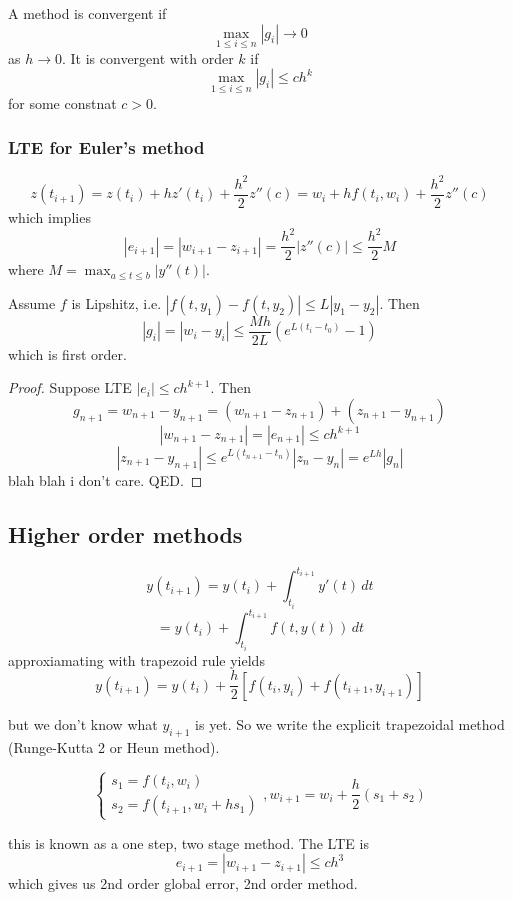 \documentclass[11pt]{article}
\begin{document}
\begin{definition}
    A method is convergent if 
    \[
        \max_{1 \le i \le n} |g_i| \rightarrow 0
    \]
    as $h \rightarrow 0$. It is convergent with order $k$ if 
       \[
        \max_{1 \le i \le n} |g_i| \le ch^k
    \] 
    for some constnat $c>0$.
\end{definition}

\subsubsection{LTE for Euler's method}
\[
    z(t_{i+1}) = z(t_i) + h z'(t_i) + \frac{h^2}{2}z''(c) = w_i + hf(t_i, w_i)+\frac{h^2}{2}z''(c)
\]
which implies
\[
    |e_{i+1}| = |w_{i+1}-z_{i+1}| = \frac{h^2}{2}|z''(c)| \le \frac{h^2}{2}M
\]
where $M = \max_{a \le t \le b} |y''(t)|$.

\begin{theorem}
    Assume $f$ is Lipshitz, i.e. $|f(t,y_1) - f(t,y_2)| \le L|y_1-y_2|$.
    Then
    \[
        |g_i| = |w_i-y_i| \le \frac{Mh}{2L}(e^{L(t_i-t_0)}-1)
    \]
    which is first order.
\end{theorem}

\begin{proof}
    Suppose LTE $|e_i| \le ch^{k+1}$. Then
    \[
        g_{n+1} = w_{n+1}-y_{n+1}= (w_{n+1}-z_{n+1})+(z_{n+1}-y_{n+1})
    \]
    \[
        |w_{n+1}-z_{n+1}| = |e_{n+1}| \le ch^{k+1}
    \]
    \[
        |z_{n+1}-y_{n+1}| \le e^{L(t_{n+1}-t_n)}|z_n-y_n| = e^{Lh}|g_n|
    \]
    blah blah i don't care. QED.
\end{proof}

\subsection{Higher order methods}

\[
    y(t_{i+1}) = y(t_i) + \int_{t_i}^{t_{i+1}} y'(t) \, dt
\]
\[
    = y(t_i) + \int_{t_i}^{t_{i+1}} f(t,y(t)) \, dt
\]
approxiamating with trapezoid rule yields
\[
     y(t_{i+1}) = y(t_i) + \frac{h }{2} \left[ f(t_i,y_i) + f(t_{i+1},y_{i+1})\right] 
\]

but we don't know what $y_{i+1}$ is yet. So we write the explicit trapezoidal method (Runge-Kutta 2 or Heun method).

\[
    \begin{cases}
        s_1 = f(t_i,w_i) \\
        s_2 = f(t_{i+1}, w_i+hs_1) 
    \end{cases},
    w_{i+1} = w_i + \frac{h}{2}(s_1+s_2)
\]

this is known as a one step, two stage method. The LTE is 
\[
    e_{i+1} = |w_{i+1}- z_{i+1}| \le ch^3
\]
which gives us 2nd order global error, 2nd order method.
\end{document}
